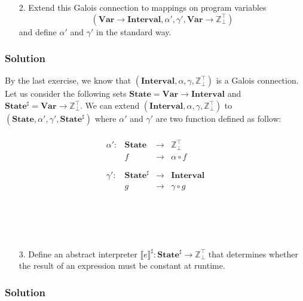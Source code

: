 \documentclass{article}
\newcommand{\interval}{\textbf{Interval}}
\newcommand{\var}{\textbf{Var}}
\newcommand{\state}{\textbf{State}}
\newcommand{\ztop}{\mathbb{Z}_{\bot}^{\top}}
\begin{document}
\begin{enumerate}
\item[2.] Extend this Galois connection to mappings on program variables $$\left( \var \longrightarrow \interval, \alpha', \gamma', \var \longrightarrow \ztop \right)$$ and define $\alpha'$ and $\gamma'$ in the standard way.\\
\end{enumerate}
\subsubsection*{Solution}
By the last exercise, we know that $(\interval, \alpha, \gamma, \ztop)$ is a Galois connection.\\

Let us consider the following sets $\state = \var \longrightarrow \interval$ and $\state^{\sharp} = \var \longrightarrow \ztop$.  We can extend $(\interval, \alpha, \gamma, \ztop)$ to $(\state, \alpha', \gamma', \state^{\sharp})$ where $\alpha'$ and $\gamma'$ are two function defined as follow:\\\\
\begin{equation*}
\begin{matrix}
      \alpha': & \state & \longrightarrow &\ztop \\
        & f &\longrightarrow & \alpha \circ f\\
        \\\\
      \gamma': & \state^{\sharp} & \longrightarrow &\interval \\
        & g &\longrightarrow & \gamma \circ g
\end{matrix} 
\end{equation*}\\\\\\\\
\begin{enumerate}
\item[3.] Define an abstract interpreter $\llbracket e \rrbracket^{\sharp}: \state^{\sharp} \longrightarrow \ztop$ that determines whether the result of an expression must be constant at runtime.
\end{enumerate}
\subsubsection*{Solution}
\end{document}
